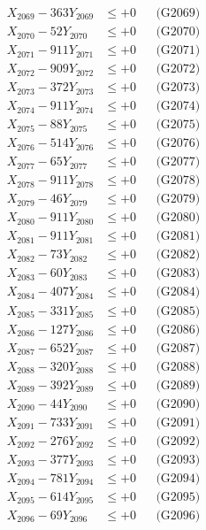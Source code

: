 \documentclass[a4paper,10pt]{article}
\begin{document}
{\begin{align}
X_{2069} - 363Y_{2069} &\leq +0 && \text{(G2069)} \\
X_{2070} - 52Y_{2070} &\leq +0 && \text{(G2070)} \\
\allowbreak
X_{2071} - 911Y_{2071} &\leq +0 && \text{(G2071)} \\
X_{2072} - 909Y_{2072} &\leq +0 && \text{(G2072)} \\
X_{2073} - 372Y_{2073} &\leq +0 && \text{(G2073)} \\
X_{2074} - 911Y_{2074} &\leq +0 && \text{(G2074)} \\
X_{2075} - 88Y_{2075} &\leq +0 && \text{(G2075)} \\
X_{2076} - 514Y_{2076} &\leq +0 && \text{(G2076)} \\
X_{2077} - 65Y_{2077} &\leq +0 && \text{(G2077)} \\
X_{2078} - 911Y_{2078} &\leq +0 && \text{(G2078)} \\
X_{2079} - 46Y_{2079} &\leq +0 && \text{(G2079)} \\
X_{2080} - 911Y_{2080} &\leq +0 && \text{(G2080)} \\
\allowbreak
X_{2081} - 911Y_{2081} &\leq +0 && \text{(G2081)} \\
X_{2082} - 73Y_{2082} &\leq +0 && \text{(G2082)} \\
X_{2083} - 60Y_{2083} &\leq +0 && \text{(G2083)} \\
X_{2084} - 407Y_{2084} &\leq +0 && \text{(G2084)} \\
X_{2085} - 331Y_{2085} &\leq +0 && \text{(G2085)} \\
X_{2086} - 127Y_{2086} &\leq +0 && \text{(G2086)} \\
X_{2087} - 652Y_{2087} &\leq +0 && \text{(G2087)} \\
X_{2088} - 320Y_{2088} &\leq +0 && \text{(G2088)} \\
X_{2089} - 392Y_{2089} &\leq +0 && \text{(G2089)} \\
X_{2090} - 44Y_{2090} &\leq +0 && \text{(G2090)} \\
\allowbreak
X_{2091} - 733Y_{2091} &\leq +0 && \text{(G2091)} \\
X_{2092} - 276Y_{2092} &\leq +0 && \text{(G2092)} \\
X_{2093} - 377Y_{2093} &\leq +0 && \text{(G2093)} \\
X_{2094} - 781Y_{2094} &\leq +0 && \text{(G2094)} \\
X_{2095} - 614Y_{2095} &\leq +0 && \text{(G2095)} \\
X_{2096} - 69Y_{2096} &\leq +0 && \text{(G2096)} \\

\end{align}}
\end{document}
